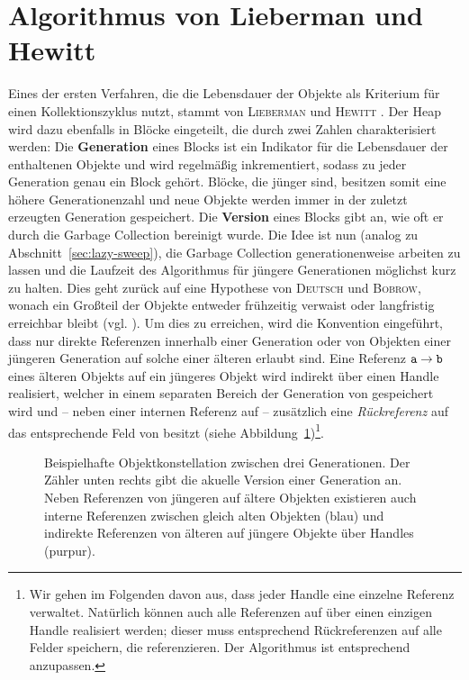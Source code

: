 \section{Algorithmus von Lieberman und Hewitt}
\label{sec:lieberman}
Eines der ersten Verfahren, die die Lebensdauer der Objekte als Kriterium für einen Kollektionszyklus nutzt, stammt von \textsc{Lieberman} und \textsc{Hewitt} \cite{lieberman1983}.
Der Heap wird dazu ebenfalls in Blöcke eingeteilt, die durch zwei Zahlen charakterisiert werden:
Die \textbf{Generation} eines Blocks ist ein Indikator für die Lebensdauer der enthaltenen Objekte und wird regelmäßig inkrementiert, sodass zu jeder Generation genau ein Block gehört.
Blöcke, die jünger sind, besitzen somit eine höhere Generationenzahl und neue Objekte werden immer in der zuletzt erzeugten Generation gespeichert.
Die \textbf{Version} eines Blocks gibt an, wie oft er durch die Garbage Collection bereinigt wurde.
Die Idee ist nun (analog zu Abschnitt~\ref{sec:lazy-sweep}), die Garbage Collection generationenweise arbeiten zu lassen und die Laufzeit des Algorithmus für jüngere Generationen möglichst kurz zu halten.
Dies geht zurück auf eine Hypothese von \textsc{Deutsch} und \textsc{Bobrow}, wonach ein Großteil der Objekte entweder frühzeitig verwaist oder langfristig erreichbar bleibt (vgl. \cite[S. 523]{deutsch1976}).
Um dies zu erreichen, wird die Konvention eingeführt, dass nur direkte Referenzen innerhalb einer Generation oder von Objekten einer jüngeren Generation auf solche einer älteren erlaubt sind.
Eine Referenz $\texttt{a} \rightarrow \texttt{b}$ eines älteren Objekts  auf ein jüngeres Objekt  wird indirekt über einen Handle realisiert, welcher in einem separaten Bereich der Generation von  gespeichert wird und -- neben einer internen Referenz auf  -- zusätzlich eine \textit{Rückreferenz}  auf das entsprechende Feld von  besitzt (siehe Abbildung~\ref{fig:lieberman-generations})\footnote{Wir gehen im Folgenden davon aus, dass jeder Handle eine einzelne Referenz verwaltet. Natürlich können auch alle Referenzen auf  über einen einzigen Handle realisiert werden; dieser muss entsprechend Rückreferenzen auf alle Felder speichern, die  referenzieren. Der Algorithmus ist entsprechend anzupassen.}.

\begin{figure}[h]
	\centering
	
	\caption[Beispielhafte Objektkonstellation zwischen drei Generationen]{Beispielhafte Objektkonstellation zwischen drei Generationen. Der Zähler unten rechts gibt die akuelle Version einer Generation an. Neben Referenzen von jüngeren auf ältere Objekten existieren auch interne Referenzen zwischen gleich alten Objekten (\textcolor{ctcolormain}{blau}) und indirekte Referenzen von älteren auf jüngere Objekte über Handles (\textcolor{ctcoloraccessory}{purpur}).}
	\label{fig:lieberman-generations}
\end{figure}

